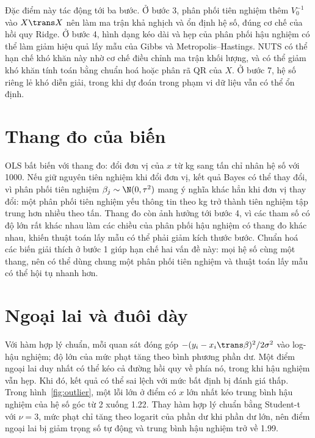\documentclass[12pt,a4paper]{report}
\begin{document}

Đặc điểm này tác động tới ba bước. Ở bước 3, phân phối tiên nghiệm thêm $V_0^{-1}$ vào $X\trans X$
nên làm ma trận khả nghịch và ổn định hệ số, đúng cơ chế của hồi quy Ridge. Ở
bước 4, hình dạng kéo dài và hẹp của phân phối hậu nghiệm có thể làm giảm hiệu quả
lấy mẫu của Gibbs và Metropolis--Hastings. NUTS có thể hạn chế khó khăn này
nhờ cơ chế điều chỉnh ma trận khối lượng, và có thể giảm
khó khăn tính toán bằng chuẩn hoá hoặc phân rã QR của $X$. Ở bước 7, hệ số riêng lẻ khó diễn
giải, trong khi dự đoán trong phạm vi dữ liệu vẫn có thể ổn định.

\section{Thang đo của biến}
\label{sec:dep-scale}

OLS bất biến với thang đo: đổi đơn vị của $x$ từ kg sang tấn chỉ nhân hệ số với
\num{1000}. Nếu giữ nguyên tiên nghiệm khi đổi đơn vị, kết quả Bayes có thể thay đổi, vì phân phối tiên nghiệm $\beta_j \sim \N(0, \tau^2)$ mang ý
nghĩa khác hẳn khi đơn vị thay đổi: một phân phối tiên nghiệm yếu thông tin theo kg trở thành
tiên nghiệm tập trung hơn nhiều theo tấn. Thang đo còn ảnh hưởng tới bước 4, vì các tham số có độ
lớn rất khác nhau làm các chiều của phân phối hậu nghiệm có thang đo khác nhau,
khiến thuật toán lấy mẫu có thể phải giảm kích thước bước. Chuẩn hoá các
biến giải thích ở bước 1 giúp hạn chế hai vấn đề này: mọi hệ số cùng một thang, nên
có thể dùng chung một phân phối tiên nghiệm và thuật toán lấy mẫu có thể hội tụ nhanh hơn.

\section{Ngoại lai và đuôi dày}
\label{sec:dep-outlier}

Với hàm hợp lý chuẩn, mỗi quan sát đóng góp $-(y_i - x_i\trans\beta)^2 / 2\sigma^2$
vào log-hậu nghiệm; độ lớn của mức phạt tăng theo bình phương phần dư. Một điểm ngoại lai duy nhất
có thể kéo cả đường hồi quy về phía nó, trong khi hậu nghiệm vẫn hẹp. Khi đó, kết quả có thể sai lệch
với mức bất định bị đánh giá thấp. Trong hình~\ref{fig:outlier}, một lỗi lớn ở điểm có $x$ lớn nhất kéo
trung bình hậu nghiệm của hệ số góc từ 2 xuống \num{1.22}. Thay hàm hợp lý chuẩn
bằng Student-t với $\nu = 3$, mức phạt chỉ tăng theo logarit của phần dư khi phần
dư lớn, nên điểm ngoại lai bị giảm trọng số tự động và trung bình hậu nghiệm trở
về \num{1.99}.
\end{document}
